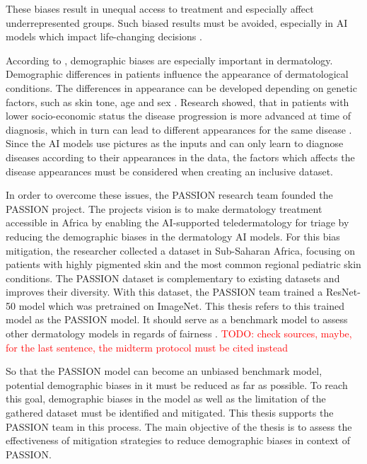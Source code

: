 \documentclass[12pt, a4paper, oneside]{book}   	%
\renewcommand{\todo}[1]{\textcolor{red}{TODO: #1}}
\begin{document}
		These biases result in unequal access to treatment and especially affect underrepresented groups. Such biased results must be avoided, especially in AI models which impact life-changing decisions \autocite{Mehrabi_2021}.
		
		According to \textcite{Diaz2022}, demographic biases are especially important in dermatology. Demographic differences in patients influence the appearance of dermatological conditions. The differences in appearance can be developed depending on genetic factors, such as skin tone, age and sex \autocite{Diaz2022}. Research showed, that in patients with lower socio-economic status the disease progression is more advanced at time of diagnosis, which in turn can lead to different appearances for the same disease \autocite{BAD2021}. Since the AI models use pictures as the inputs and can only learn to diagnose diseases according to their appearances in the data, the factors which affects the disease appearances must be considered when creating an inclusive dataset.
		
		In order to overcome these issues, the PASSION research team founded the PASSION project. The projects vision is to make dermatology treatment accessible in Africa by enabling the AI-supported \gls{teledermatology} for triage by reducing the demographic biases in the dermatology AI models. For this bias mitigation, the researcher collected a dataset in Sub-Saharan Africa, focusing on patients with highly pigmented skin and the most common regional \gls{pediatric} skin conditions. The PASSION dataset is complementary to existing datasets and improves their diversity. With this dataset, the PASSION team trained a ResNet-50 model which was pretrained on ImageNet. This thesis refers to this trained model as the PASSION model. It should serve as a benchmark model to assess other dermatology models in regards of fairness \autocite{Gottfrois2024}. \todo{check sources, maybe, for the last sentence, the midterm protocol must be cited instead}
		
		So that the PASSION model can become an unbiased benchmark model, potential demographic biases in it must be reduced as far as possible. To reach this goal, demographic biases in the model as well as the limitation of the gathered dataset must be identified and mitigated. This thesis supports the PASSION team in this process. The main objective of the thesis is to assess the effectiveness of mitigation strategies to reduce demographic biases in context of PASSION.
		
		

		
\end{document}
